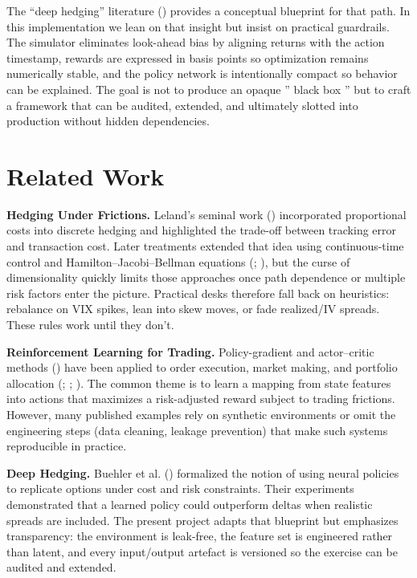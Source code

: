 \documentclass[,11pt,letterpaper,twocolumn]{article}
\begin{document}
The ``deep hedging'' literature
() provides a
conceptual blueprint for that path. In this implementation we lean on
that insight but insist on practical guardrails. The simulator
eliminates look-ahead bias by aligning returns with the action timestamp,
rewards are expressed in basis points so optimization remains
numerically stable, and the policy network is intentionally compact so
behavior can be explained. The goal is not to produce an opaque '' black
box '' but to craft a framework that can be audited,
extended, and ultimately slotted into production without hidden
dependencies.

\section{Related Work}\label{related-work}

\textbf{Hedging Under Frictions.} Leland's seminal work
() incorporated proportional costs
into discrete hedging and highlighted the trade-off between tracking
error and transaction cost. Later treatments extended that idea using
continuous-time control and Hamilton--Jacobi--Bellman equations
(;
), but the curse of
dimensionality quickly limits those approaches once path dependence or
multiple risk factors enter the picture. Practical desks therefore fall
back on heuristics: rebalance on VIX spikes, lean into skew moves, or
fade realized/IV spreads. These rules work until they don't.

\textbf{Reinforcement Learning for Trading.} Policy-gradient and
actor--critic methods () have been applied to order execution, market making, and
portfolio allocation (;
;
). The common theme is to
learn a mapping from state features into actions that maximizes a
risk-adjusted reward subject to trading frictions. However, many
published examples rely on synthetic environments or omit the
engineering steps (data cleaning, leakage prevention) that make such
systems reproducible in practice.

\textbf{Deep Hedging.} Buehler et al.
() formalized
the notion of using neural policies to replicate options under cost and
risk constraints. Their experiments demonstrated that a learned policy
could outperform deltas when realistic spreads are included. The present
project adapts that blueprint but emphasizes transparency: the
environment is leak-free, the feature set is engineered rather than
latent, and every input/output artefact is versioned so the exercise can
be audited and extended.
\end{document}
